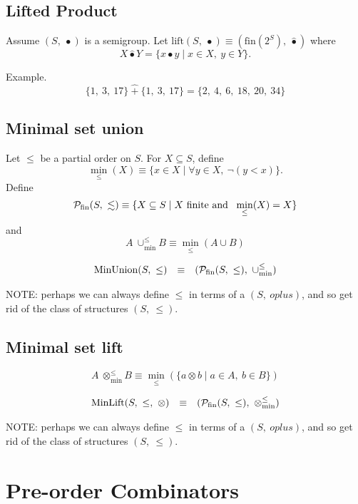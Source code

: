 \documentclass[10pt]{article}
\newcommand{\minunion}{\cup_{\min}^{\leq}}
\begin{document}
\subsection{Lifted Product} 

Assume $(S,\ \bullet)$ is a semigroup. 
Let 
$\mathrm{lift}(S,\ \bullet) \equiv (\mathrm{fin}(2^S),\ \hat{\bullet})$ where 
\[ 
X \hat{\bullet} Y  = \{x \bullet y \mid x\in X,\ y\in Y\}. 
\]

Example. 
\[
    \{1,\ 3,\ 17\}\ \hat{+}\ \{1,\ 3,\ 17\} = \{2,\ 4,\ 6,\ 18,\ 20,\ 34\} 
\] 


\subsection{Minimal set union} 

Let $\leq$ be a partial order on $S$. 
For $X \subseteq S$, define 
\[
\min_\leq(X) \equiv \{x \in X \mid \forall y \in X,\  \neg(y < x)\}. 
\] 
Define 
\[
{\cal P}_{\mathrm{fin}}(S,\ \lesssim) 
   \equiv 
\{X \subseteq S\mid \mbox{$X$ finite and \ }\min_\leq(X) = X\} 
\] 
and 
\[
  A\ \minunion B  \equiv  \min_\leq(A\cup B) 
\] 

\[ 
\begin{array}{rcl} 
\mathrm{MinUnion}(S,\ \leq)
   & \equiv 
   & ({\cal P}_{\mathrm{fin}}(S,\ \leq),\ \minunion)
\end{array} 
\] 


NOTE: perhaps we can always define $\leq$ in terms of a $(S,\ oplus)$, and so 
get rid of the class of structures $(S,\ \leq)$. 

\subsection{Minimal set lift} 

\[
  A\ \otimes_{\min}^{\leq} B  \equiv   \min_\leq(\{a\otimes b\mid a\in A,\ b\in B\})
\] 

\[ 
\begin{array}{rcl} 
\mathrm{MinLift}(S,\ \leq,\ \otimes)
   & \equiv 
   & ({\cal P}_{\mathrm{fin}}(S,\ \leq),\ \otimes_{\min}^{\leq})
\end{array} 
\] 


NOTE: perhaps we can always define $\leq$ in terms of a $(S,\ oplus)$, and so 
get rid of the class of structures $(S,\ \leq)$. 


\section{Pre-order Combinators} 
\end{document}
